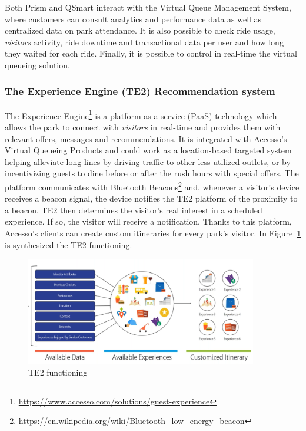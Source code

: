 Both Prism and QSmart interact with the Virtual Queue Management System, where customers can consult
analytics and performance data as well as centralized data on park attendance.
It is also possible to check ride usage, \textit{visitors} activity, ride downtime and transactional data per user and how long they waited for each ride.
Finally, it is possible to control in real-time the virtual queueing solution.

\subsubsection{The Experience Engine (TE2) Recommendation system}
The Experience Engine\footnote{\url{https://www.accesso.com/solutions/guest-experience}} is a platform-as-a-service (PaaS) technology
which allows the park to connect with \textit{visitors} in real-time and provides them with relevant offers, messages and recommendations.
It is integrated with Accesso's Virtual Queueing Products and could work as a location-based targeted system~\cite{accesso-location-based-exp} helping alleviate
long lines by driving traffic to other less utilized outlets, or by incentivizing guests to dine before or after the rush
hours with special offers.
The platform communicates with Bluetooth Beacons\footnote{\url{https://en.wikipedia.org/wiki/Bluetooth_low_energy_beacon}} and,
whenever a visitor's device receives a beacon signal, the device notifies the TE2 platform of the proximity to a beacon.
TE2 then determines the visitor's real interest in a scheduled experience.
If so, the visitor will receive a notification.
Thanks to this platform, Accesso's clients can create custom itineraries for every park's visitor.
In Figure~\ref{fig:te2ex} is synthesized the TE2 functioning.

\begin{figure}[H]
	\centering
	\includegraphics[width=0.9\textwidth]{img/te2ex}
	\caption{TE2 functioning}
	\label{fig:te2ex}
\end{figure}

